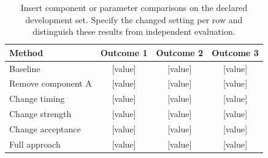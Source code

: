 \begin{table}[!ht]\centering\small
\caption{\suggest Insert component or parameter comparisons on the declared development set. Specify the changed setting per row and distinguish these results from independent evaluation.}
\label{tab:ablation}
\setlength{\tabcolsep}{6pt}
\begin{tabular}{lccc}\toprule
Method & Outcome 1 & Outcome 2 & Outcome 3\\\midrule
Baseline & [value] & [value] & [value]\\
Remove component A & [value] & [value] & [value]\\
Change timing & [value] & [value] & [value]\\
Change strength & [value] & [value] & [value]\\
Change acceptance & [value] & [value] & [value]\\
Full approach & [value] & [value] & [value]\\
\bottomrule\end{tabular}
\end{table}
